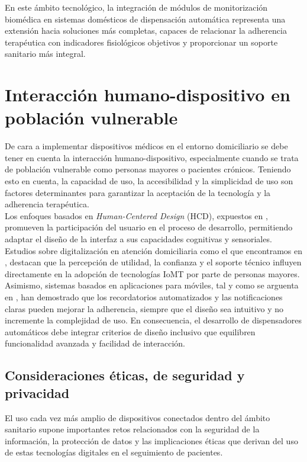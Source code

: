 En este ámbito tecnológico, la integración de módulos de monitorización biomédica en sistemas domésticos de dispensación automática representa una extensión hacia soluciones más completas, capaces de relacionar la adherencia terapéutica con indicadores fisiológicos objetivos y proporcionar un soporte sanitario más integral.\\

\section{Interacción humano-dispositivo en población vulnerable}
\label{sec:interaccion_usuario}

De cara a implementar dispositivos médicos en el entorno domiciliario se debe tener en cuenta la interacción humano-dispositivo, especialmente cuando se trata de población vulnerable como personas mayores o pacientes crónicos. Teniendo esto en cuenta, la capacidad de uso, la accesibilidad y la simplicidad de uso son factores determinantes para garantizar la aceptación de la tecnología y la adherencia terapéutica.\\

Los enfoques basados en \textit{Human-Centered Design} (HCD), expuestos en  \cite{hcd2024}, promueven la participación del usuario en el proceso de desarrollo, permitiendo adaptar el diseño de la interfaz a sus capacidades cognitivas y sensoriales. Estudios sobre digitalización en atención domiciliaria como el que encontramos en \cite{olderhomecare2023}, destacan que la percepción de utilidad, la confianza y el soporte técnico influyen directamente en la adopción de tecnologías IoMT por parte de personas mayores.\\

Asimismo, sistemas basados en aplicaciones para móviles, tal y como se arguenta en \cite{smartphone2013}, han demostrado que los recordatorios automatizados y las notificaciones claras pueden mejorar la adherencia, siempre que el diseño sea intuitivo y no incremente la complejidad de uso. En consecuencia, el desarrollo de dispensadores automáticos debe integrar criterios de diseño inclusivo que equilibren funcionalidad avanzada y facilidad de interacción.

\subsection{Consideraciones éticas, de seguridad y privacidad}
\label{sec:eticas}

El uso cada vez más amplio de dispositivos conectados dentro del ámbito sanitario supone importantes retos relacionados con la seguridad de la información, la protección de datos y las implicaciones éticas que derivan del uso de estas tecnologías digitales en el seguimiento de pacientes.

